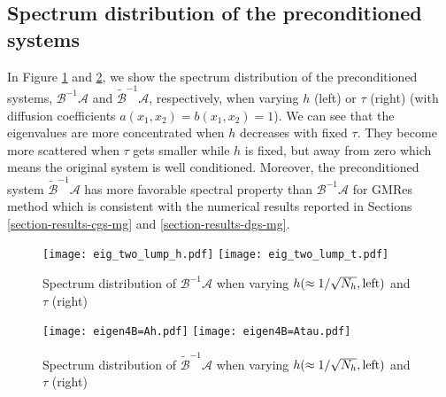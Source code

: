 \documentclass[smallcondensed]{svjour3}
\numberwithin{equation}{section} \numberwithin{table}{section}
\numberwithin{figure}{section}
\numberwithin{algorithm}{section}
\begin{document}
\subsection{Spectrum distribution of the preconditioned systems}
In Figure \ref{spectrum4E} and \ref{spectrum4tBA}, we show the spectrum distribution of the preconditioned systems, $\mathcal{B}^{-1}\mathcal{A}$ and $\tilde{\mathcal{B}}^{-1}\mathcal{A}$, respectively, when varying $h$ (left) or $\tau$ (right) (with diffusion coefficients $a(x_1,x_2)=b(x_1,x_2)=1$). We can see that the eigenvalues are more concentrated when $h$ decreases with fixed $\tau$. They become more scattered when $\tau$ gets smaller while $h$ is fixed, but away from zero which means the original system is well conditioned. Moreover, the preconditioned system $\tilde{\mathcal{B}}^{-1}\mathcal{A}$ has more favorable spectral property than $\mathcal{B}^{-1}\mathcal{A}$ for GMRes method which is consistent with the numerical results reported in Sections \ref{section-results-cgs-mg} and \ref{section-results-dgs-mg}.
\begin{figure}
\centering
\texttt{[image: eig\_two\_lump\_h.pdf]}
\hspace{-0.65in}
\texttt{[image: eig\_two\_lump\_t.pdf]}
\vspace{-1.0in}
\caption{Spectrum distribution of $\mathcal{B}^{-1}\mathcal{A}$ when varying $h (\approx1/\sqrt{N_h}, {\rm left})$ and $\tau$ (right)}
\label{spectrum4E}

\vspace{0cm}

\end{figure}
\begin{figure}
\centering
\texttt{[image: eigen4B=Ah.pdf]}
\hspace{-0.65in}
\texttt{[image: eigen4B=Atau.pdf]}
\vspace{-1.0in}
\caption{Spectrum distribution of $\tilde{\mathcal{B}}^{-1}\mathcal{A}$ when varying $h (\approx1/\sqrt{N_h}, {\rm left})$ and $\tau$ (right)}
\label{spectrum4tBA}
\vspace{0cm}
\end{figure}
\end{document}
